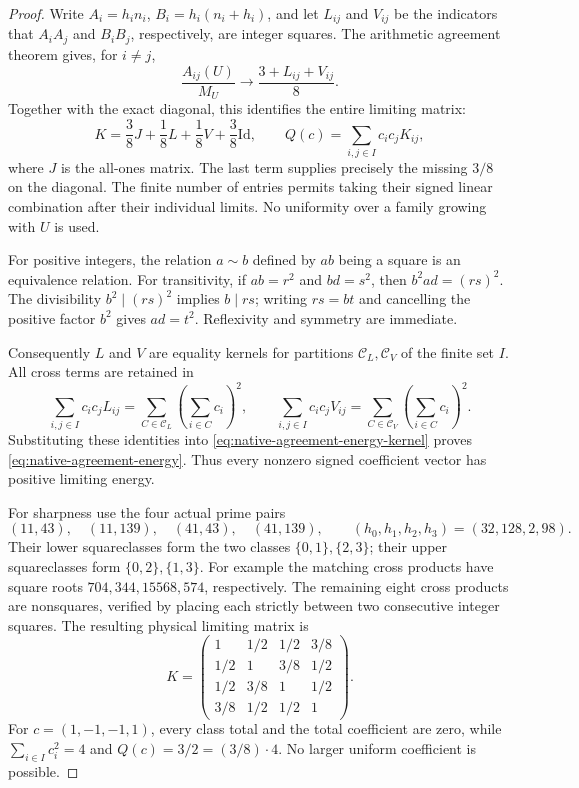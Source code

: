 \documentclass[11pt]{article}
\begin{document}
\begin{proof}
Write \(A_i=h_in_i\), \(B_i=h_i(n_i+h_i)\), and let
\(L_{ij}\) and \(V_{ij}\) be the indicators that \(A_iA_j\)
and \(B_iB_j\), respectively, are integer squares.
The arithmetic agreement theorem gives, for \(i\ne j\),
\[
 \frac{A_{ij}(U)}{M_U}\longrightarrow
                   \frac{3+L_{ij}+V_{ij}}8.
\]
Together with the exact diagonal, this identifies the entire limiting
matrix:
\begin{equation}
 K=\frac38J+\frac18L+\frac18V+\frac38\mathrm{Id},
 \qquad Q(c)=\sum_{i,j\in I}c_ic_jK_{ij},
 \label{eq:native-agreement-energy-kernel}
\end{equation}
where \(J\) is the all-ones matrix.
The last term supplies precisely the missing \(3/8\) on the diagonal.
The finite number of entries permits taking their signed linear
combination after their individual limits. No uniformity over a
family growing with \(U\) is used.

For positive integers, the relation \(a\sim b\) defined by
\(ab\) being a square is an equivalence relation.
For transitivity, if \(ab=r^2\) and \(bd=s^2\), then
\(b^2ad=(rs)^2\). The divisibility \(b^2\mid(rs)^2\)
implies \(b\mid rs\); writing \(rs=bt\) and cancelling
the positive factor \(b^2\) gives \(ad=t^2\).
Reflexivity and symmetry are immediate.

Consequently \(L\) and \(V\) are equality kernels for partitions
\(\mathcal C_L,\mathcal C_V\) of the finite set \(I\).
All cross terms are retained in
\[
 \sum_{i,j\in I}c_ic_jL_{ij}
   =\sum_{C\in\mathcal C_L}\left(\sum_{i\in C}c_i\right)^2,
 \qquad
 \sum_{i,j\in I}c_ic_jV_{ij}
   =\sum_{C\in\mathcal C_V}\left(\sum_{i\in C}c_i\right)^2.
\]
Substituting these identities into
\eqref{eq:native-agreement-energy-kernel} proves
\eqref{eq:native-agreement-energy}. Thus every nonzero signed
coefficient vector has positive limiting energy.

For sharpness use the four actual prime pairs
\[
 (11,43),\quad(11,139),\quad(41,43),\quad(41,139),
 \qquad (h_0,h_1,h_2,h_3)=(32,128,2,98).
\]
Their lower squareclasses form the two classes
\(\{0,1\},\{2,3\}\); their upper squareclasses form
\(\{0,2\},\{1,3\}\).
For example the matching cross products have square roots
\(704,344,15568,574\), respectively.
The remaining eight cross products are nonsquares, verified by
placing each strictly between two consecutive integer squares.
The resulting physical limiting matrix is
\[
 K=
 \begin{pmatrix}
 1&1/2&1/2&3/8\\
 1/2&1&3/8&1/2\\
 1/2&3/8&1&1/2\\
 3/8&1/2&1/2&1
 \end{pmatrix}.
\]
For \(c=(1,-1,-1,1)\), every class total and the total coefficient
are zero, while \(\sum_{i\in I}c_i^2=4\) and
\(Q(c)=3/2=(3/8)\cdot4\). No larger uniform coefficient is possible.
\end{proof}
\end{document}
